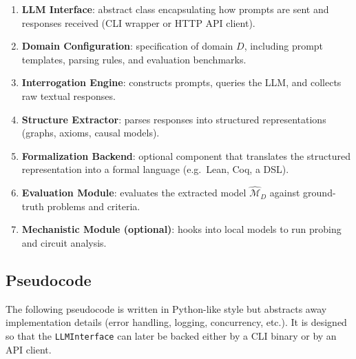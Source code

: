 \documentclass[11pt]{article}
\begin{document}
	\begin{enumerate}[label=\textbf{C\arabic*}, nosep]
		\item \textbf{LLM Interface}: abstract class encapsulating how prompts are sent and responses received (CLI wrapper or HTTP API client).
		\item \textbf{Domain Configuration}: specification of domain $D$, including prompt templates, parsing rules, and evaluation benchmarks.
		\item \textbf{Interrogation Engine}: constructs prompts, queries the LLM, and collects raw textual responses.
		\item \textbf{Structure Extractor}: parses responses into structured representations (graphs, axioms, causal models).
		\item \textbf{Formalization Backend}: optional component that translates the structured representation into a formal language (e.g.\ Lean, Coq, a DSL).
		\item \textbf{Evaluation Module}: evaluates the extracted model $\hat{\mathcal{M}}_D$ against ground-truth problems and criteria.
		\item \textbf{Mechanistic Module (optional)}: hooks into local models to run probing and circuit analysis.
	\end{enumerate}
	
	\subsection{Pseudocode}
	
	The following pseudocode is written in Python-like style but abstracts away implementation details (error handling, logging, concurrency, etc.). It is designed so that the \texttt{LLMInterface} can later be backed either by a CLI binary or by an API client.
	
\end{document}
